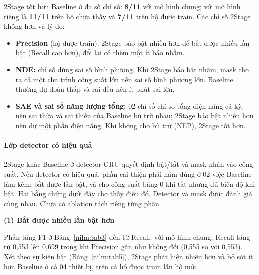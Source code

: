 2Stage tốt hơn Baseline ở đa số chỉ số: \textbf{8/11} với mô hình chung; với mô hình riêng là \textbf{11/11} trên hộ chưa thấy và \textbf{7/11} trên hộ được train. Các chỉ số 2Stage không hơn và lý do:

\begin{itemize}
\item \textbf{Precision} (hộ được train): 2Stage báo bật nhiều hơn để bắt được nhiều lần bật (Recall cao hơn), đổi lại có thêm một ít báo nhầm.
\item \textbf{NDE:} chỉ số dùng sai số bình phương. Khi 2Stage báo bật nhầm, mask cho ra cả một chu trình công suất lớn nên sai số bình phương lớn. Baseline thường dự đoán thấp và rải đều nên ít phút sai lớn.
\item \textbf{SAE và sai số năng lượng tổng:} 02 chỉ số chỉ so tổng điện năng cả kỳ, nên sai thừa và sai thiếu của Baseline bù trừ nhau; 2Stage báo bật nhiều hơn nên dư một phần điện năng. Khi không cho bù trừ (NEP), 2Stage tốt hơn.
\end{itemize}

\paragraph{Lớp detector có hiệu quả}

2Stage khác Baseline ở detector GRU quyết định bật/tắt và mask nhân vào công suất. Nếu detector có hiệu quả, phần cải thiện phải nằm đúng ở 02 việc Baseline làm kém: bắt được lần bật, và cho công suất bằng 0 khi tắt nhưng đủ biên độ khi bật. Hai bằng chứng dưới đây cho thấy điều đó. Detector và mask được đánh giá cùng nhau. Chưa có ablation tách riêng từng phần.

\medskip\noindent\textbf{(1) Bắt được nhiều lần bật hơn}\par\nopagebreak

Phần tăng F1 ở Bảng~\ref{nilm:tab3} đến từ Recall: với mô hình chung, Recall tăng từ 0,553 lên 0,699 trong khi Precision gần như không đổi (0,555 so với 0,553). Xét theo sự kiện bật (Bảng~\ref{nilm:tab5}), 2Stage phát hiện nhiều hơn và bỏ sót ít hơn Baseline ở cả 04 thiết bị, trên cả hộ được train lẫn hộ mới.


